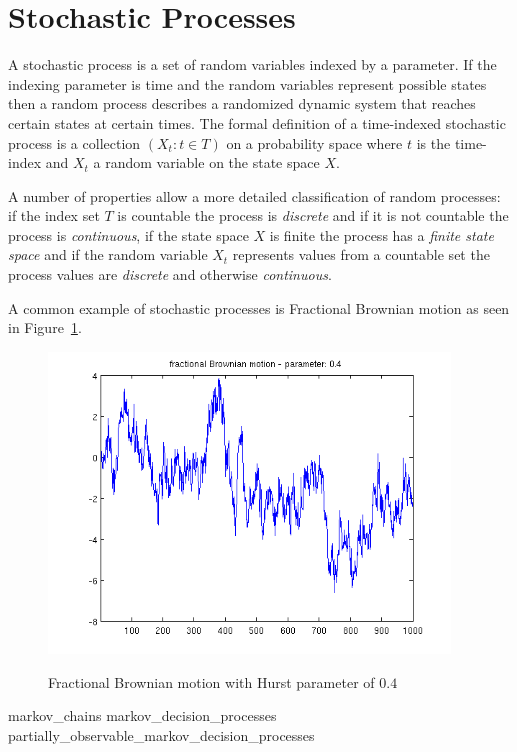 \section{Stochastic Processes}

A stochastic process is a set of random variables indexed by a parameter. If the indexing parameter is time and the random variables represent possible states then a random process describes a randomized dynamic system that reaches certain states at certain times. The formal definition of a time-indexed stochastic process is a collection $(X_t: t \in T)$ on a probability space where $t$ is the time-index and $X_t$ a random variable on the state space $X$.

A number of properties allow a more detailed classification of random processes: if the index set $T$ is countable the process is \textit{discrete} and if it is not countable the process is \textit{continuous}, if the state space $X$ is finite the process has a \textit{finite state space} and if the random variable $X_t$ represents values from a countable set the process values are \textit{discrete} and otherwise \textit{continuous}.

A common example of stochastic processes is Fractional Brownian motion as seen in Figure~\ref{fracbromotion}.

\begin{figure}
\begin{center}
\includegraphics[height=8cm]{media/fractional_brownian_motion}\\
\end{center}
\caption{Fractional Brownian motion with Hurst parameter of $0.4$}
\label{fracbromotion}
\end{figure}

{markov_chains}
{markov_decision_processes}
{partially_observable_markov_decision_processes}